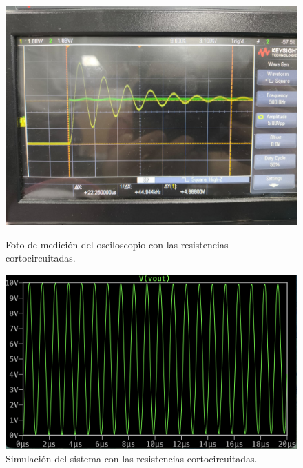 \documentclass{article}
\begin{document}
  
                    \begin{figure}[H]
                    \centering
                    \begin{minipage}{0.49\textwidth}
                        \centering
                        \includegraphics[width=\linewidth]{Resistencias_corto.jpg}
                        \caption{Foto de medición del osciloscopio con las resistencias cortocircuitadas.}
                        \label{fig:CORTREAL}
                    \end{minipage}\hfill
                    \begin{minipage}{0.49\textwidth}
                        \centering
                        \includegraphics[width=\linewidth]{CORTOCIRCUITO.png}
                        \caption{Simulación del sistema con las resistencias cortocircuitadas. }
                        \label{fig:CORTSIM}
                    \end{minipage}
                \end{figure}
                
\end{document}
